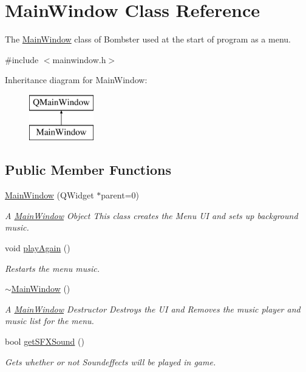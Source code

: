 \hypertarget{class_main_window}{\section{Main\-Window Class Reference}
\label{class_main_window}
}


The \hyperlink{class_main_window}{Main\-Window} class of Bombster used at the start of program as a menu.  




{\ttfamily \#include $<$mainwindow.\-h$>$}

Inheritance diagram for Main\-Window\-:\begin{figure}[H]
\begin{center}
\leavevmode
\includegraphics[height=2.000000cm]{class_main_window}
\end{center}
\end{figure}
\subsection*{Public Member Functions}
\begin{DoxyCompactItemize}
\item 
\hyperlink{class_main_window_a8b244be8b7b7db1b08de2a2acb9409db}{Main\-Window} (Q\-Widget $\ast$parent=0)
\begin{DoxyCompactList}\small\item\em A \hyperlink{class_main_window}{Main\-Window} Object This class creates the Menu U\-I and sets up background music. \end{DoxyCompactList}\item 
void \hyperlink{class_main_window_ab622d7f3b4082b8221185e216991e602}{play\-Again} ()
\begin{DoxyCompactList}\small\item\em Restarts the menu music. \end{DoxyCompactList}\item 
\hyperlink{class_main_window_ae98d00a93bc118200eeef9f9bba1dba7}{$\sim$\-Main\-Window} ()
\begin{DoxyCompactList}\small\item\em A \hyperlink{class_main_window}{Main\-Window} Destructor Destroys the U\-I and Removes the music player and music list for the menu. \end{DoxyCompactList}\item 
bool \hyperlink{class_main_window_a3935a5aee4fcdbc9568995da6ceed437}{get\-S\-F\-X\-Sound} ()
\begin{DoxyCompactList}\small\item\em Gets whether or not Soundeffects will be played in game. \end{DoxyCompactList}\end{DoxyCompactItemize}
